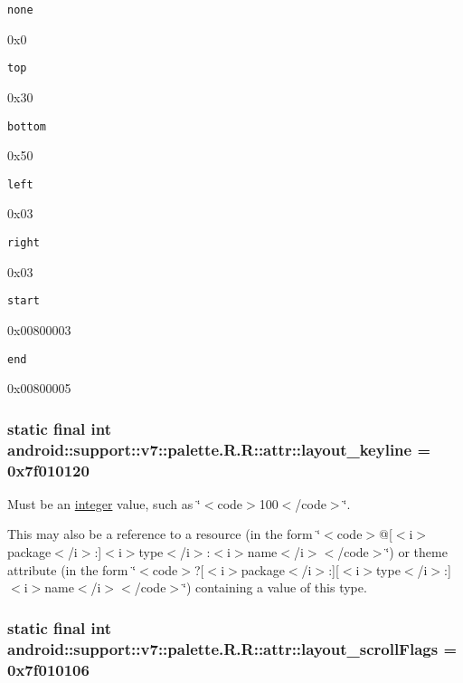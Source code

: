 {\tt none}

0x0

{\tt top}

0x30

{\tt bottom}

0x50

{\tt left}

0x03

{\tt right}

0x03

{\tt start}

0x00800003

{\tt end}

0x00800005\hypertarget{classandroid_1_1support_1_1v7_1_1palette_1_1_r_1_1attr_885bdb043f76c37c00482624670f7390}{
\subsubsection[{layout\_\-keyline}]{\setlength{\rightskip}{0pt plus 5cm}static final int android::support::v7::palette.R.R::attr::layout\_\-keyline = 0x7f010120}}
\label{classandroid_1_1support_1_1v7_1_1palette_1_1_r_1_1attr_885bdb043f76c37c00482624670f7390}


Must be an \hyperlink{classandroid_1_1support_1_1v7_1_1palette_1_1_r_1_1integer}{integer} value, such as \char`\"{}$<$code$>$100$<$/code$>$\char`\"{}. 

This may also be a reference to a resource (in the form \char`\"{}$<$code$>$@\mbox{[}$<$i$>$package$<$/i$>$:\mbox{]}$<$i$>$type$<$/i$>$:$<$i$>$name$<$/i$>$$<$/code$>$\char`\"{}) or theme attribute (in the form \char`\"{}$<$code$>$?\mbox{[}$<$i$>$package$<$/i$>$:\mbox{]}\mbox{[}$<$i$>$type$<$/i$>$:\mbox{]}$<$i$>$name$<$/i$>$$<$/code$>$\char`\"{}) containing a value of this type. \hypertarget{classandroid_1_1support_1_1v7_1_1palette_1_1_r_1_1attr_324be21a79ec9ef67ae84fecef765b63}{
\subsubsection[{layout\_\-scrollFlags}]{\setlength{\rightskip}{0pt plus 5cm}static final int android::support::v7::palette.R.R::attr::layout\_\-scrollFlags = 0x7f010106}}
\label{classandroid_1_1support_1_1v7_1_1palette_1_1_r_1_1attr_324be21a79ec9ef67ae84fecef765b63}


